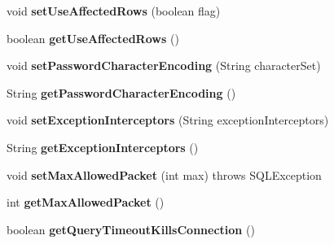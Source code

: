 \begin{DoxyCompactItemize}
void {\bfseries set\+Use\+Affected\+Rows} (boolean flag)
\item 
\mbox{\label{classcom_1_1mysql_1_1jdbc_1_1_connection_properties_impl_ad42b329f06c1e319899f0947ad35e009}} 
boolean {\bfseries get\+Use\+Affected\+Rows} ()
\item 
\mbox{\label{classcom_1_1mysql_1_1jdbc_1_1_connection_properties_impl_a9064aeef8c998b651bff69b687a69a75}} 
void {\bfseries set\+Password\+Character\+Encoding} (String character\+Set)
\item 
\mbox{\label{classcom_1_1mysql_1_1jdbc_1_1_connection_properties_impl_a04ea6005881f2d899e5e2028d1a114bf}} 
String {\bfseries get\+Password\+Character\+Encoding} ()
\item 
\mbox{\label{classcom_1_1mysql_1_1jdbc_1_1_connection_properties_impl_abc536128d8a1e904ea661d1c9bd72514}} 
void {\bfseries set\+Exception\+Interceptors} (String exception\+Interceptors)
\item 
\mbox{\label{classcom_1_1mysql_1_1jdbc_1_1_connection_properties_impl_a58efa7aea04bcb003574fcf8042eee1f}} 
String {\bfseries get\+Exception\+Interceptors} ()
\item 
\mbox{\label{classcom_1_1mysql_1_1jdbc_1_1_connection_properties_impl_aadd41a0e2019644315595d9a4b0eb3b0}} 
void {\bfseries set\+Max\+Allowed\+Packet} (int max)  throws S\+Q\+L\+Exception 
\item 
\mbox{\label{classcom_1_1mysql_1_1jdbc_1_1_connection_properties_impl_a91a64a7a8fa47c31aefc74a5f5be30e3}} 
int {\bfseries get\+Max\+Allowed\+Packet} ()
\item 
\mbox{\label{classcom_1_1mysql_1_1jdbc_1_1_connection_properties_impl_a61ce51d16c916c3b6c4814fd44788196}} 
boolean {\bfseries get\+Query\+Timeout\+Kills\+Connection} ()

\end{DoxyCompactItemize}
